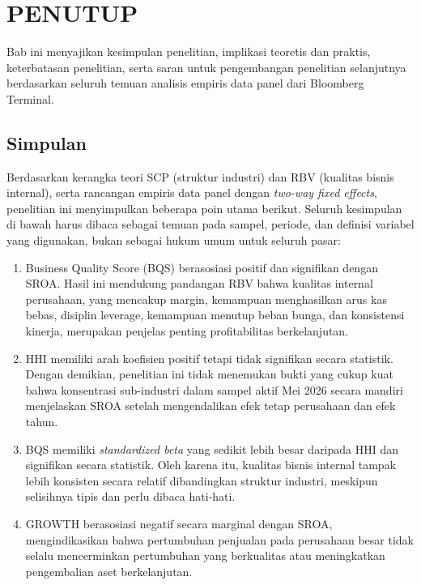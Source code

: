 \documentclass[12pt,a4paper]{article}
\providecommand{\tightlist}{%
  \setlength{\itemsep}{0pt}\setlength{\parskip}{0pt}%
}
\begin{document}
\section{PENUTUP}\label{penutup}

Bab ini menyajikan kesimpulan penelitian, implikasi teoretis dan
praktis, keterbatasan penelitian, serta saran untuk pengembangan
penelitian selanjutnya berdasarkan seluruh temuan analisis empiris data
panel dari Bloomberg Terminal.

\subsection{Simpulan}\label{simpulan}

Berdasarkan kerangka teori SCP (struktur industri) dan RBV (kualitas
bisnis internal), serta rancangan empiris data panel dengan
\emph{two-way fixed effects}, penelitian ini menyimpulkan beberapa poin
utama berikut. Seluruh kesimpulan di bawah harus dibaca sebagai temuan
pada sampel, periode, dan definisi variabel yang digunakan, bukan
sebagai hukum umum untuk seluruh pasar:

\begin{enumerate}
\def\labelenumi{\arabic{enumi}.}
\tightlist
\item
  Business Quality Score (BQS) berasosiasi positif dan signifikan dengan
  SROA. Hasil ini mendukung pandangan RBV bahwa kualitas internal
  perusahaan, yang mencakup margin, kemampuan menghasilkan arus kas
  bebas, disiplin leverage, kemampuan menutup beban bunga, dan
  konsistensi kinerja, merupakan penjelas penting profitabilitas
  berkelanjutan.
\item
  HHI memiliki arah koefisien positif tetapi tidak signifikan secara
  statistik. Dengan demikian, penelitian ini tidak menemukan bukti yang
  cukup kuat bahwa konsentrasi sub-industri dalam sampel aktif Mei 2026
  secara mandiri menjelaskan SROA setelah mengendalikan efek tetap
  perusahaan dan efek tahun.
\item
  BQS memiliki \emph{standardized beta} yang sedikit lebih besar
  daripada HHI dan signifikan secara statistik. Oleh karena itu,
  kualitas bisnis internal tampak lebih konsisten secara relatif
  dibandingkan struktur industri, meskipun selisihnya tipis dan perlu
  dibaca hati-hati.
\item
  GROWTH berasosiasi negatif secara marginal dengan SROA,
  mengindikasikan bahwa pertumbuhan penjualan pada perusahaan besar
  tidak selalu mencerminkan pertumbuhan yang berkualitas atau
  meningkatkan pengembalian aset berkelanjutan.
\end{enumerate}
\end{document}

